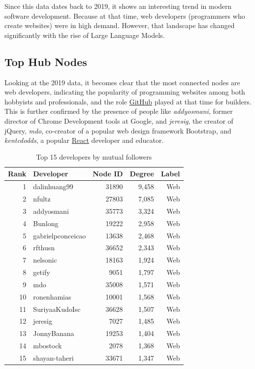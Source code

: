 \documentclass[letterpaper]{article}
\begin{document}
Since this data dates back to 2019, it shows an interesting trend in modern software development. Because at that time, web developers (programmers who create websites) were in high demand. However, that landscape has changed significantly with the rise of Large Language Models. \cite{Upwork2026AIWebDev}

\subsection{Top Hub Nodes}
Looking at the 2019 data, it becomes clear that the most connected nodes are web developers, indicating the popularity of programming websites among both hobbyists and professionals, and the role \href{https://github.com}{GitHub} played at that time for builders. This is further confirmed by the presence of people like \textit{addyosmani}, former director of Chrome Development tools at Google, and \textit{jeresig}, the creator of jQuery, \textit{mdo}, co-creator of a popular web design framework Bootstrap, and \textit{kentcdodds}, a popular \href{https://react.dev}{React} developer and educator.
\begin{table}[H]
  \centering
  \begin{tabular}{rlrrr}
    \toprule
    \textbf{Rank} & \textbf{Developer} & \textbf{Node ID} & \textbf{Degree} & \textbf{Label} \\
    \midrule
    1  & dalinhuang99         & 31890 & 9,458 & Web \\
    2  & nfultz               & 27803 & 7,085 & Web \\
    3  & addyosmani           & 35773 & 3,324 & Web \\
    4  & Bunlong              & 19222 & 2,958 & Web \\
    5  & gabrielpconceicao    & 13638 & 2,468 & Web \\
    6  & rfthusn              & 36652 & 2,343 & Web \\
    7  & nelsonic             & 18163 & 1,924 & Web \\
    8  & getify               & 9051  & 1,797 & Web \\
    9  & mdo                  & 35008 & 1,571 & Web \\
    10 & ronenhamias          & 10001 & 1,568 & Web \\
    11 & SuriyaaKudoIsc       & 36628 & 1,507 & Web \\
    12 & jeresig              & 7027  & 1,485 & Web \\
    13 & JonnyBanana          & 19253 & 1,404 & Web \\
    14 & mbostock             & 2078  & 1,368 & Web \\
    15 & shayan-taheri        & 33671 & 1,347 & Web \\
    \bottomrule
  \end{tabular}
  \caption{Top 15 developers by mutual followers}
  \label{tab:top_hubs}
\end{table}
\end{document}
